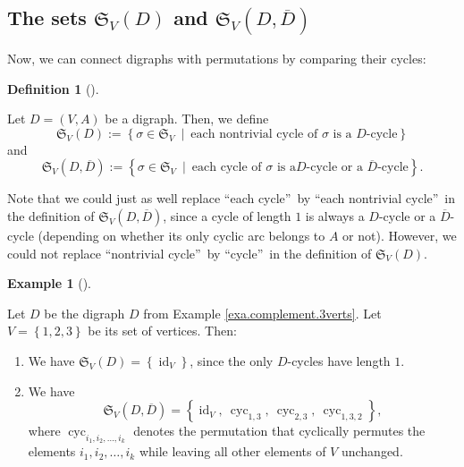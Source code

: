 \documentclass[numbers=enddot,12pt,final,onecolumn,notitlepage]{scrartcl}%
\numberwithin{exer}{section}
\theoremstyle{definition}
\newtheorem{defi}[theo]{Definition}
\newenvironment{definition}[1][]
{\begin{defi}[#1]\begin{leftbar}}
{\end{leftbar}\end{defi}}
\newtheorem{exam}[theo]{Example}
\newenvironment{example}[1][]
{\begin{exam}[#1]\begin{leftbar}}
{\end{leftbar}\end{exam}}
\begin{document}
\subsection{The sets $\mathfrak{S}_{V}\left(  D\right)  $ and $\mathfrak{S}%
_{V}\left(  D,\overline{D}\right)  $}

Now, we can connect digraphs with permutations by comparing their cycles:

\begin{definition}
\label{def.SVD}Let $D=\left(  V,A\right)  $ be a digraph. Then, we
define\footnotemark%
\[
\mathfrak{S}_{V}\left(  D\right)  :=\left\{  \sigma\in\mathfrak{S}_{V}%
\ \mid\ \text{each nontrivial cycle of }\sigma\text{ is a }D\text{-cycle}%
\right\}
\]
and%
\[
\mathfrak{S}_{V}\left(  D,\overline{D}\right)  :=\left\{  \sigma
\in\mathfrak{S}_{V}\ \mid\ \text{each cycle of }\sigma\text{ is a
}D\text{-cycle or a }\overline{D}\text{-cycle}\right\}  .
\]

\end{definition}

Note that we could just as well replace \textquotedblleft each
cycle\textquotedblright\ by \textquotedblleft each nontrivial
cycle\textquotedblright\ in the definition of $\mathfrak{S}_{V}\left(
D,\overline{D}\right)  $, since a cycle of length $1$ is always a $D$-cycle or
a $\overline{D}$-cycle (depending on whether its only cyclic arc belongs to
$A$ or not). However, we could not replace \textquotedblleft nontrivial
cycle\textquotedblright\ by \textquotedblleft cycle\textquotedblright\ in the
definition of $\mathfrak{S}_{V}\left(  D\right)  $.

\begin{example}
Let $D$ be the digraph $D$ from Example \ref{exa.complement.3verts}. Let
$V=\left\{  1,2,3\right\}  $ be its set of vertices. Then:

\begin{enumerate}
\item[\textbf{(a)}] We have $\mathfrak{S}_{V}\left(  D\right)  =\left\{
\operatorname*{id}\nolimits_{V}\right\}  $, since the only $D$-cycles have
length $1$.

\item[\textbf{(b)}] We have%
\[
\mathfrak{S}_{V}\left(  D,\overline{D}\right)  =\left\{  \operatorname*{id}%
\nolimits_{V},\ \operatorname*{cyc}\nolimits_{1,3},\ \operatorname*{cyc}%
\nolimits_{2,3},\ \operatorname*{cyc}\nolimits_{1,3,2}\right\}  ,
\]
where $\operatorname*{cyc}\nolimits_{i_{1},i_{2},\ldots,i_{k}}$ denotes the
permutation that cyclically permutes the elements $i_{1},i_{2},\ldots,i_{k}$
while leaving all other elements of $V$ unchanged.
\end{enumerate}
\end{example}
\end{document}
